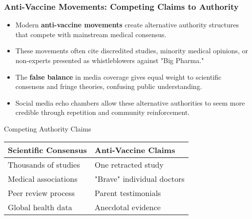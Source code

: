 \documentclass{beamer}
\begin{document}
	\begin{frame}
		\frametitle{Anti-Vaccine Movements: Competing Claims to Authority}
		\begin{itemize}
			\item Modern \textbf{anti-vaccine movements} create alternative authority structures that compete with mainstream medical consensus.
			\item These movements often cite discredited studies, minority medical opinions, or non-experts presented as whistleblowers against "Big Pharma."
			\item The \textbf{false balance} in media coverage gives equal weight to scientific consensus and fringe theories, confusing public understanding.
			\item Social media echo chambers allow these alternative authorities to seem more credible through repetition and community reinforcement.
		\end{itemize}
		
		\begin{block}{Competing Authority Claims}
			\begin{tabular}{|l|l|}
				\hline
				\textbf{Scientific Consensus} & \textbf{Anti-Vaccine Claims} \\
				\hline
				Thousands of studies & One retracted study \\
				Medical associations & "Brave" individual doctors \\
				Peer review process & Parent testimonials \\
				Global health data & Anecdotal evidence \\
				\hline
			\end{tabular}
		\end{block}
	\end{frame}
	
\end{document}
